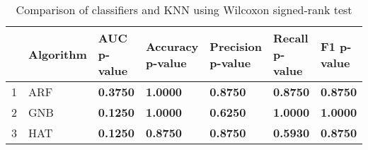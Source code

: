 \begin{table}
\footnotesize
\caption{Comparison of classifiers and KNN using Wilcoxon signed-rank test}
\label{tab:wilcoxon comparison}
\begin{tabular}{lllllll}
\hline
 & Algorithm & AUC p-value & Accuracy p-value & Precision p-value & Recall p-value & F1 p-value \\
\hline
1 & ARF & \textbf{0.3750} & \textbf{1.0000} & \textbf{0.8750} & \textbf{0.8750} & \textbf{0.8750} \\
2 & GNB & \textbf{0.1250} & \textbf{1.0000} & \textbf{0.6250} & \textbf{1.0000} & \textbf{1.0000} \\
3 & HAT & \textbf{0.1250} & \textbf{0.8750} & \textbf{0.8750} & \textbf{0.5930} & \textbf{0.8750} \\
\hline
\end{tabular}
\end{table}
